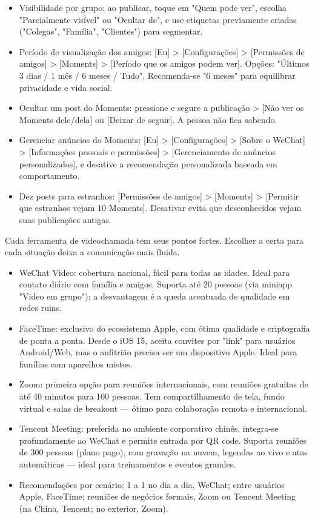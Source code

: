 
\begin{itemize}
  \item Visibilidade por grupo: ao publicar, toque em "Quem pode ver", escolha "Parcialmente visível" ou "Ocultar de", e use etiquetas previamente criadas ("Colegas", "Família", "Clientes") para segmentar.
  \item Período de visualização dos amigos: [Eu] > [Configurações] > [Permissões de amigos] > [Moments] > [Período que os amigos podem ver]. Opções: "Últimos 3 dias / 1 mês / 6 meses / Tudo". Recomenda-se "6 meses" para equilibrar privacidade e vida social.
  \item Ocultar um post do Moments: pressione e segure a publicação > [Não ver os Moments dele/dela] ou [Deixar de seguir]. A pessoa não fica sabendo.
  \item Gerenciar anúncios do Moments: [Eu] > [Configurações] > [Sobre o WeChat] > [Informações pessoais e permissões] > [Gerenciamento de anúncios personalizados], e desative a recomendação personalizada baseada em comportamento.
  \item Dez posts para estranhos: [Permissões de amigos] > [Moments] > [Permitir que estranhos vejam 10 Moments]. Desativar evita que desconhecidos vejam suas publicações antigas.
\end{itemize}


Cada ferramenta de videochamada tem seus pontos fortes. Escolher a certa para cada situação deixa a comunicação mais fluida.

\begin{itemize}
  \item WeChat Video: cobertura nacional, fácil para todas as idades. Ideal para contato diário com família e amigos. Suporta até 20 pessoas (via miniapp "Video em grupo"); a desvantagem é a queda acentuada de qualidade em redes ruins.
  \item FaceTime: exclusivo do ecossistema Apple, com ótima qualidade e criptografia de ponta a ponta. Desde o iOS 15, aceita convites por "link" para usuários Android/Web, mas o anfitrião precisa ser um dispositivo Apple. Ideal para famílias com aparelhos mistos.
  \item Zoom: primeira opção para reuniões internacionais, com reuniões gratuitas de até 40 minutos para 100 pessoas. Tem compartilhamento de tela, fundo virtual e salas de breakout — ótimo para colaboração remota e internacional.
  \item Tencent Meeting: preferida no ambiente corporativo chinês, integra-se profundamente ao WeChat e permite entrada por QR code. Suporta reuniões de 300 pessoas (plano pago), com gravação na nuvem, legendas ao vivo e atas automáticas — ideal para treinamentos e eventos grandes.
  \item Recomendações por cenário: 1 a 1 no dia a dia, WeChat; entre usuários Apple, FaceTime; reuniões de negócios formais, Zoom ou Tencent Meeting (na China, Tencent; no exterior, Zoom).
\end{itemize}

